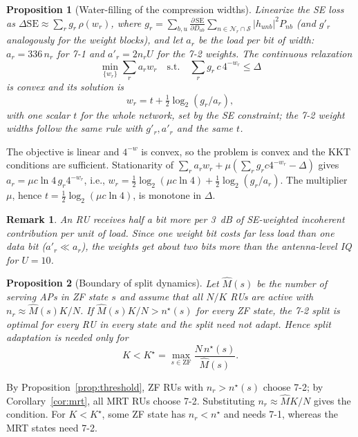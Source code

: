 \documentclass[10pt, final, journal, letterpaper, twocolumn]{IEEEtran}
\newtheorem{proposition}{Proposition}
\newtheorem{remark}{Remark}
\begin{document}
\begin{proposition}[Water-filling of the compression widths]
\label{prop:wf}
Linearize the SE loss as $\Delta\mathrm{SE}\approx\sum_r g_r\,\rho(w_r)$, where $g_r=\sum_{b,u}\frac{\partial\,\mathrm{SE}}{\partial D_{ub}}\sum_{n\in\mathcal{N}_r\cap\mathcal{S}}|h_{unb}|^2P_{nb}$ (and $g'_r$ analogously for the weight blocks), and let $a_r$ be the load per bit of width: $a_r=336\,n_r$ for 7-1 and $a'_r=2n_rU$ for the 7-2 weights. The continuous relaxation
\begin{equation}
  \min_{\{w_r\}}\sum_r a_r w_r\quad\text{s.t.}\quad \sum_r g_r\,c\,4^{-w_r}\le\Delta
\end{equation}
is convex and its solution is
\begin{equation}
  w_r = t + \tfrac12\log_2\!\left(g_r/a_r\right),
  \label{eq:wf}
\end{equation}
with one scalar $t$ for the whole network, set by the SE constraint; the 7-2 weight widths follow the same rule with $g'_r,a'_r$ and the same $t$.
\end{proposition}
\begin{IEEEproof}
The objective is linear and $4^{-w}$ is convex, so the problem is convex and the KKT conditions are sufficient. Stationarity of $\sum_r a_rw_r+\mu(\sum_r g_rc4^{-w_r}-\Delta)$ gives $a_r=\mu c\ln4\,g_r4^{-w_r}$, i.e., $w_r=\frac12\log_2(\mu c\ln 4)+\frac12\log_2(g_r/a_r)$. The multiplier $\mu$, hence $t=\frac12\log_2(\mu c\ln4)$, is monotone in $\Delta$.
\end{IEEEproof}

\begin{remark}
An RU receives half a bit more per 3~dB of SE-weighted incoherent contribution per unit of load. Since one weight bit costs far less load than one data bit ($a'_r\ll a_r$), the weights get about two bits more than the antenna-level IQ for $U=10$.
\end{remark}

\begin{proposition}[Boundary of split dynamics]
\label{prop:boundary}
Let $\hat M(s)$ be the number of serving APs in ZF state $s$ and assume that all $N/K$ RUs are active with $n_r\approx\hat M(s)K/N$. If $\hat M(s)K/N>n^\star(s)$ for every ZF state, the 7-2 split is optimal for every RU in every state and the split need not adapt. Hence split adaptation is needed only for
\begin{equation}
  K < K^\star = \max_{s\in\mathrm{ZF}} \frac{N\,n^\star(s)}{\hat M(s)}.
  \label{eq:kstar}
\end{equation}
\end{proposition}
\begin{IEEEproof}
By Proposition~\ref{prop:threshold}, ZF RUs with $n_r>n^\star(s)$ choose 7-2; by Corollary~\ref{cor:mrt}, all MRT RUs choose 7-2. Substituting $n_r\approx\hat MK/N$ gives the condition. For $K<K^\star$, some ZF state has $n_r<n^\star$ and needs 7-1, whereas the MRT states need 7-2.
\end{IEEEproof}
\end{document}
